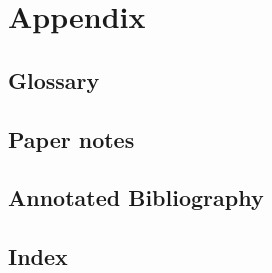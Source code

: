 \part{Appendix}
\chapter{Glossary}


\chapter{Paper notes}


\chapter{Annotated Bibliography}


\chapter{Index}
